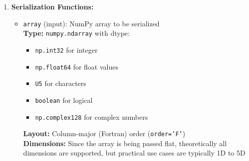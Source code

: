\begin{enumerate}
\begin{enumerate}
\begin{itemize}
                    \item \texttt{tox\_serialize\_logical\_nd(array, filename)} -
                          Serialize N-dimensional logical arrays.
                          
                    \item \texttt{tox\_deserialize\_logical\_nd(filename)} - Deserialize
                          N-dimensional logical arrays.
                          
                    \item \texttt{tox\_serialize\_complex\_nd(array, filename)} -
                          Serialize N-dimensional complex arrays.
                          
                    \item \texttt{tox\_deserialize\_complex\_nd(filename)} - Deserialize
                          N-dimensional complex arrays.
                          
                    \item \texttt{get\_array\_metadata(filename)} - Retrieve array
                          dimensions and metadata
                  \end{itemize}
                  
            \item \textbf{Serialization Functions:}
                  \begin{itemize}
                    \item \texttt{array} (input): NumPy array to be serialized \\ \textbf{Type:}
                          \texttt{numpy.ndarray} with dtype:
                          \begin{itemize}
                            \item \texttt{np.int32} for integer
                                  
                            \item \texttt{np.float64} for float values
                                  
                            \item \texttt{U5} for characters
                                  
                            \item \texttt{boolean} for logical
                                  
                            \item \texttt{np.complex128} for complex numbers
                          \end{itemize}
                          \textbf{Layout:} Column-major (Fortran) order (\texttt{order='F'})
                          \\ \textbf{Dimensions:} Since the array is being passed flat,
                          theoretically all dimensions are supported, but practical use cases
                          are typically 1D to 5D
                          

\end{itemize}
\end{enumerate}
\end{enumerate}
